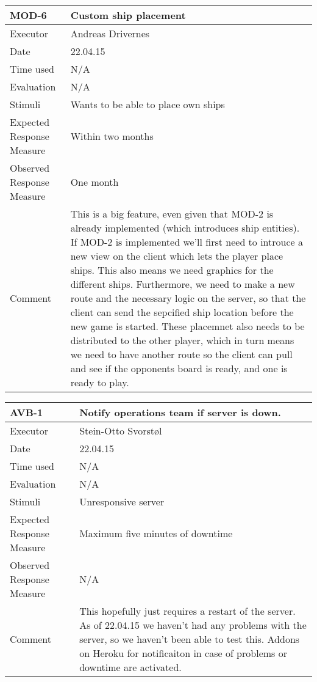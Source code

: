 \begin{table}[H]
\begin{tabular}{|l|p{10cm}|}
\hline
\textbf{MOD-6} & Custom ship placement \\ \hline
Executor    & Andreas Drivernes         \\ \hline
Date        & 22.04.15         \\ \hline
Time used   & N/A        \\ \hline
Evaluation  & N/A          \\ \hline
Stimuli     & Wants to be able to place own ships \\ \hline
Expected Response Measure &  Within two months       \\ \hline
Observed Response Measure &  One month       \\ \hline
Comment     &  This is a big feature, even given that MOD-2 is already implemented (which introduces ship entities). If MOD-2 is implemented we'll first need to introuce a new view on the client which lets the player place ships. This also means we need graphics for the different ships. Furthermore, we need to make a new route and the necessary logic on the server, so that the client can send the sepcified ship location before the new game is started. These placemnet also needs to be distributed to the other player, which in turn means we need to have another route so the client can pull and see if the opponents board is ready, and one is ready to play.    \\ \hline
\end{tabular}
\end{table}

\begin{table}[H]
\begin{tabular}{|l|p{10cm}|}
\hline
\textbf{AVB-1} & Notify operations team if server is down. \\ \hline
Executor    & Stein-Otto Svorstøl           \\ \hline
Date        & 22.04.15         \\ \hline
Time used   & N/A           \\ \hline
Evaluation  & N/A        \\ \hline
Stimuli     & Unresponsive server  \\ \hline
Expected Response Measure & Maximum five minutes of downtime   \\ \hline
Observed Response Measure & N/A       \\ \hline
Comment     & This hopefully just requires a restart of the server. As of 22.04.15 we haven't had any problems with the server, so we haven't been able to test this. Addons on Heroku for notificaiton in case of problems or downtime are activated.  \\ \hline
\end{tabular}
\end{table}

